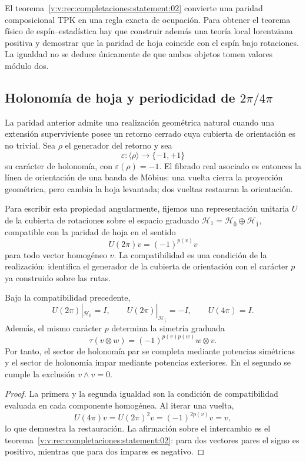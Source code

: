 El teorema~\ref{v:v:rec:completaciones:statement:02} convierte una paridad composicional TPK en una regla exacta de
ocupación. Para obtener el teorema físico de espín--estadística hay que
construir además una teoría local lorentziana positiva y demostrar que la
paridad de hoja coincide con el espín bajo rotaciones. La igualdad no se
deduce únicamente de que ambos objetos tomen valores módulo dos.

\subsection{Holonomía de hoja y periodicidad de \texorpdfstring{\(2\pi/4\pi\)}{2pi/4pi}}
\label{v:v:rec:completaciones:section:05}

La paridad anterior admite una realización geométrica natural cuando una
extensión superviviente posee un retorno cerrado cuya cubierta de orientación
es no trivial. Sea \(\rho\) el generador del retorno y sea
\[
 \varepsilon:\langle\rho\rangle\longrightarrow\{-1,+1\}
\]
su carácter de holonomía, con \(\varepsilon(\rho)=-1\). El fibrado real
asociado es entonces la línea de orientación de una banda de Möbius: una
vuelta cierra la proyección geométrica, pero cambia la hoja levantada; dos
vueltas restauran la orientación.

Para escribir esta propiedad angularmente, fijemos una representación
unitaria \(U\) de la cubierta de rotaciones sobre el espacio graduado
\(\mathcal H_1=\mathcal H_{\bar0}\oplus\mathcal H_{\bar1}\), compatible con
la paridad de hoja en el sentido
\[
 U(2\pi)v=(-1)^{p(v)}v
\]
para todo vector homogéneo \(v\). La compatibilidad es una condición de la
realización: identifica el generador de la cubierta de orientación con el
carácter \(p\) ya construido sobre las rutas.

\begin{theorem}
\label{v:v:rec:thm:dos-cuatro-pi-estadistica}
Bajo la compatibilidad precedente,
\[
 U(2\pi)|_{\mathcal H_{\bar0}}=I,
 \qquad
 U(2\pi)|_{\mathcal H_{\bar1}}=-I,
 \qquad
 U(4\pi)=I.
\]
Además, el mismo carácter \(p\) determina la simetría graduada
\[
 \tau(v\otimes w)=(-1)^{p(v)p(w)}w\otimes v.
\]
Por tanto, el sector de holonomía par se completa mediante potencias
simétricas y el sector de holonomía impar mediante potencias exteriores. En
el segundo se cumple la exclusión \(v\wedge v=0\).
\end{theorem}

\begin{proof}
La primera y la segunda igualdad son la condición de compatibilidad evaluada
en cada componente homogénea. Al iterar una vuelta,
\[
 U(4\pi)v=U(2\pi)^2v=(-1)^{2p(v)}v=v,
\]
lo que demuestra la restauración. La afirmación sobre el intercambio es el
teorema~\ref{v:v:rec:completaciones:statement:02}: para dos vectores
pares el signo es positivo, mientras que para dos impares es negativo.
\end{proof}

